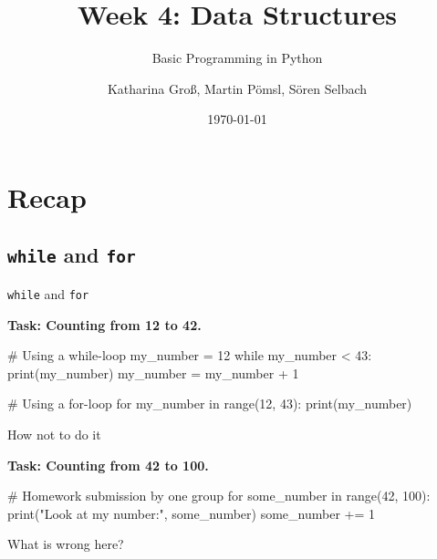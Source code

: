



\title[Data Structures]{Week 4: Data Structures}
\subtitle{Basic Programming in Python}

\author[kgross, mpoemsl, sselbach]{Katharina Groß, Martin Pömsl, Sören Selbach}

\date{\today}

\begin{frame}[plain]
    \titlepage
\end{frame}

\begin{frame}
    \tableofcontents
\end{frame}


\section{Recap}

\subsection{\texttt{while} and \texttt{for}}

\begin{frame}[fragile]{\texttt{while} and \texttt{for}}

    \textbf{Task: Counting from 12 to 42.}

    \begin{pythoncode}
# Using a while-loop
my_number = 12
while my_number < 43:
    print(my_number)
    my_number = my_number + 1

# Using a for-loop
for my_number in range(12, 43):
    print(my_number)

    \end{pythoncode}

\end{frame}

\begin{frame}[fragile]{How not to do it}

    \textbf{Task: Counting from 42 to 100.}

    \begin{pythoncode}
# Homework submission by one group
for some_number in range(42, 100):
    print("Look at my number:", some_number)
    some_number += 1

    \end{pythoncode}

    \vspace{1em}

    What is wrong here?


\end{frame}

